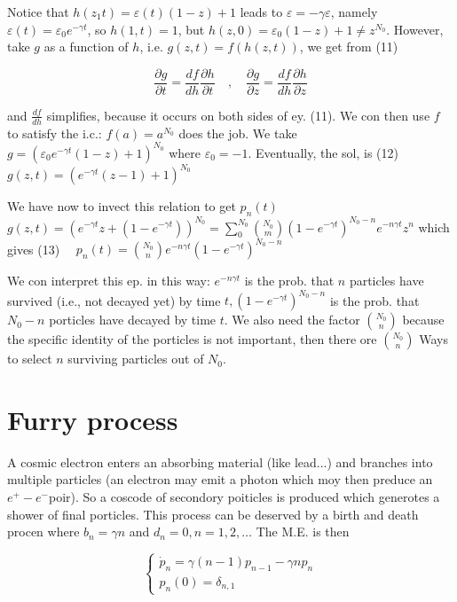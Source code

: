 Notice that $h\left(z_{1} t\right)=\varepsilon(t)(1-z)+1$ leads to $\varepsilon=-\gamma \varepsilon$, namely $\varepsilon(t)=\varepsilon_{0} e^{-\gamma t}$, so $h(1, t)=1$, but $h(z, 0)=\varepsilon_{0}(1-z)+1 \neq z^{N_{0}}$. However, take $g$ as a function of $h$, i.e. $g(z, t)=f(h(z, t))$, we get from (11)

$$ 
\frac{\partial g}{\partial t}=\frac{d f}{d h} \frac{\partial h}{\partial t} \quad , \quad \frac{\partial g}{\partial z}=\frac{d f}{d h} \frac{\partial h}{\partial z}
$$ 

and $\frac{d f}{d h}$ simplifies, because it occurs on both sides of ey. (11). We con then use $f$ to satisfy the i.c.: $f(a)=a^{N_{0}}$ does the job. We take $g=\left(\varepsilon_{0} e^{-\gamma t}(1-z)+1\right)^{N_{0}}$ where $\varepsilon_{0}=-1$. Eventually, the sol, is
(12) $g(z, t)=\left(e^{-\gamma t}(z-1)+1\right)^{N_{0}}$

We have now to invect this relation to get $p_{n}(t)$
$g(z, t)=\left(e^{-\gamma t} z+\left(1-e^{-\gamma t}\right)\right)^{N_{0}}=\sum_{0}^{N_{0}}\binom{N_{0}}{m}\left(1-e^{-\gamma t}\right)^{N_{0}-n} e^{-n \gamma t} z^{n}$
which gives
(13) $\quad p_{n}(t)=\binom{N_{0}}{n} e^{-n \gamma t}\left(1-e^{-\gamma t}\right)^{N_{0}-n}$

We con interpret this ep. in this way: $e^{-n \gamma t}$ is the prob. that $n$ particles have survived (i.e., not decayed yet) by time $t,\left(1-e^{-\gamma t}\right)^{N_{0}-n}$ is the prob. that $N_{0}-n$ porticles have decayed by time $t$. We also need the factor $\binom{N_{0}}{n}$ because the specific identity of the porticles is not important, then there ore $\binom{N_{0}}{n}$ Ways to select $n$ surviving particles out of $N_{0}$.

\section*{Furry process}
A cosmic electron enters an absorbing material (like lead...) and branches into multiple particles (an electron may emit a photon which moy then preduce an $e^{+}-e^{-}$poir). So a coscode of secondory poiticles is produced which generotes a shower of final porticles. This process can be deserved by a birth and death procen where $b_{n}=\gamma n$ and $d_{n}=0, n=1,2, \ldots$
The M.E. is then

$$ 
\left\{\begin{array}{l}\dot{p}_{n}=\gamma(n-1) p_{n-1}-\gamma n p_{n} \\ p_{n}(0)=\delta_{n, 1}\end{array}\right.
$$ 

